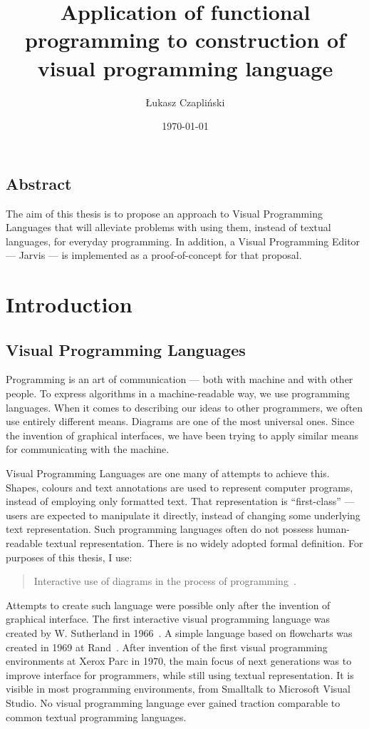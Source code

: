 \documentclass[11pt]{scrartcl}
\title{Application of functional programming to construction of visual
  programming language}
\author{Łukasz Czapliński}
\date{\today}
\begin{document}
\maketitle

\subsection*{Abstract}
The aim of this thesis is to propose an approach to  Visual Programming
Languages that will alleviate problems with using them, instead of textual
languages, for everyday programming.
In addition, a Visual Programming Editor --- Jarvis --- is implemented as a
proof-of-concept for that proposal.

\section{Introduction}
\subsection{Visual Programming Languages}
Programming is an art of communication --- both with machine and with other
people.
To express algorithms in a machine-readable way, we use programming languages.
When it comes to describing our ideas to other programmers, we often use
entirely different means.
Diagrams are one of the most universal ones.
Since the invention of graphical interfaces, we have been trying to apply
similar means for communicating with the machine.

Visual Programming Languages are one many of attempts to achieve this.
Shapes, colours and text annotations are used to represent computer programs,
instead of employing only formatted text.
That representation is “first-class” --- users are expected to manipulate it
directly, instead of changing some underlying text representation.
Such programming languages often do not possess human-readable textual
representation.
There is no widely adopted formal definition.
For purposes of this thesis, I use:
\blockquote{Interactive use of diagrams
  in the process of programming~\cite[Chapter 2]{nickerson1995visual}.}


Attempts to create such language were possible only after the invention of
graphical interface.
The first interactive visual programming language was created by W. Sutherland
in 1966~\cite{firstVPL}.
A simple language based on flowcharts was created in 1969 at Rand~\cite{grail}.
After invention of the first visual programming environments at Xerox Parc in
1970, the main focus of next generations was to improve interface for
programmers, while still using textual representation.
It is visible in most programming environments, from Smalltalk to Microsoft
Visual Studio.
No visual programming language ever gained traction comparable to common textual
programming languages.
\end{document}

